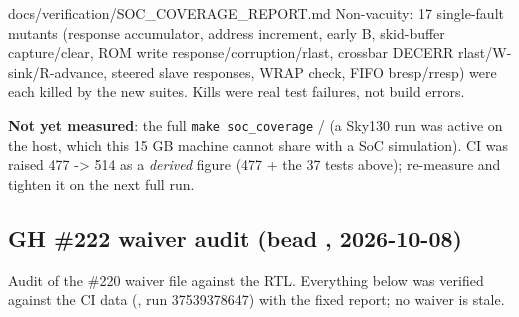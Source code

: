 \begin{relocated}{docs/verification/SOC_COVERAGE_REPORT.md}
Non-vacuity: 17 single-fault mutants (response accumulator, address
increment, early B, skid-buffer capture/\allowbreak{}clear, ROM write
response/\allowbreak{}corruption/\allowbreak{}rlast, crossbar DECERR
rlast/\allowbreak{}W-sink/\allowbreak{}R-advance, steered slave
responses, WRAP check, FIFO bresp/\allowbreak{}rresp) were each killed
by the new suites. Kills were real test failures, not build errors.

\textbf{Not yet measured}: the full
\texttt{make\ soc\_\allowbreak{}coverage} /  (a Sky130
 run was active on the host, which this 15 GB machine
cannot share with a SoC simulation). CI  was raised 477
-\textgreater{} 514 as a \emph{derived} figure (477 + the 37 tests
above); re-measure and tighten it on the next full run.

\subsection{\texorpdfstring{GH \#222 waiver audit (bead ,
2026-10-08)}{GH \#222 waiver audit (bead , 2026-10-08)}}\label{tm:flow:soc-coverage-report:gh-222-waiver-audit-bead-kp61-2026-10-08}

Audit of the \#220 waiver file against the RTL. Everything below was
verified against the  CI data (, run
37539378647) with the fixed report; no waiver is stale.

{\footnotesize\setlength{\tabcolsep}{3pt}

}
\end{relocated}
